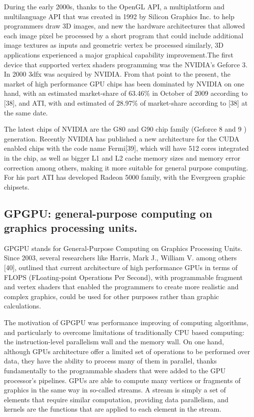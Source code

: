 \documentclass[thesis=M,english]{FITthesis}[2011/07/15]
\begin{document}
During the early 2000s, thanks to the OpenGL API, a multiplatform and multilanguage API that was created in 1992 by Silicon Graphics Inc. to help programmers draw 3D images, and new the hardware architectures that allowed each image pixel be processed by a short program that could include additional image textures as inputs and geometric vertex be processed similarly, 3D applications experienced a major graphical capability improvement.The first device that supported vertex shaders programming was the NVIDIA’s Geforce 3. In 2000 3dfx was acquired by NVIDIA. From that point to the present, the market of high performance GPU chips has been dominated by NVIDIA on one hand, with an estimated market-share of 63.46\% in October of 2009 according to [38], and ATI, with and estimated of 28.97\% of market-share according to [38] at the same date. 

The latest chips of NVIDIA are the G80 and G90 chip family (Geforce 8 and 9 ) generation. Recently NVIDIA has published a new architecture for the CUDA enabled chips with the code name Fermi[39], which will have 512 cores integrated in the chip, as well as bigger L1 and L2 cache memory sizes and memory error correction among others, making it more suitable for general purpose computing. For his part ATI has developed Radeon 5000 family, with the Evergreen graphic chipsets.

\subsection{GPGPU: general-purpose computing on graphics processing units.}
GPGPU stands for General-Purpose Computing on Graphics Processing Units. Since 2003, several researchers like Harris, Mark J., William V. among others [40], outlined that current architecture of high performance GPUs in terms of FLOPS (FLoating-point Operations Per Second), with programmable fragment and vertex shaders that enabled the programmers to create more realistic and complex graphics, could be used for other purposes rather than graphic calculations.

The motivation of GPGPU was performance improving of computing algorithms, and particularly to overcome limitations of traditionally CPU based computing: the instruction-level parallelism wall and the memory wall. On one hand, although GPUs architecture offer a limited set of operations to be performed over data, they have the ability to process many of them in parallel, thanks fundamentally to the programmable shaders that were added to the GPU processor’s pipelines. GPUs are able to compute many vertices or fragments of graphics in the same way in so-called streams. A stream is simply a set of elements that require similar computation, providing data parallelism, and kernels are the functions that are applied to each element in the stream.
\end{document}
